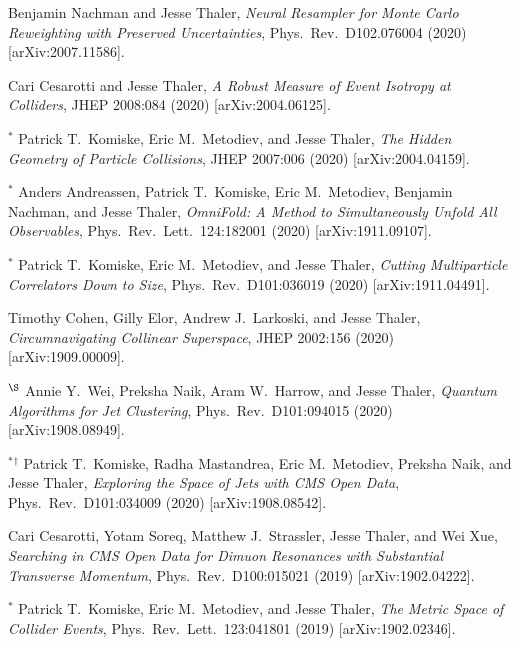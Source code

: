 \begin{list}{[]\addtocounter{jessecount}{-1}}{\leftmargin=3em \itemsep=4pt}
\item
 Benjamin Nachman and Jesse Thaler,
\emph{Neural Resampler for Monte Carlo Reweighting with Preserved Uncertainties},
Phys.\ Rev.\ D102.076004 (2020)
[arXiv:2007.11586].

\item
 Cari Cesarotti and Jesse Thaler,
\emph{A Robust Measure of Event Isotropy at Colliders},
JHEP 2008:084 (2020)
[arXiv:2004.06125].

\item
${}^\ast$ Patrick T.\ Komiske, Eric M.\ Metodiev, and Jesse Thaler,
\emph{The Hidden Geometry of Particle Collisions},
JHEP 2007:006 (2020)
[arXiv:2004.04159].

\item
${}^\ast$ Anders Andreassen, Patrick T.\ Komiske, Eric M.\ Metodiev, Benjamin Nachman, and Jesse Thaler,
\emph{OmniFold: A Method to Simultaneously Unfold All Observables},
Phys.\ Rev.\ Lett.\ 124:182001 (2020)
[arXiv:1911.09107].

\item
${}^\ast$ Patrick T.\ Komiske, Eric M.\ Metodiev, and Jesse Thaler,
\emph{Cutting Multiparticle Correlators Down to Size},
Phys.\ Rev.\ D101:036019 (2020)
[arXiv:1911.04491].

\item
 Timothy Cohen, Gilly Elor, Andrew J.\ Larkoski, and Jesse Thaler,
\emph{Circumnavigating Collinear Superspace},
JHEP 2002:156 (2020)
[arXiv:1909.00009].

\item
${}^\S$ Annie Y.\ Wei, Preksha Naik, Aram W.\ Harrow, and Jesse Thaler,
\emph{Quantum Algorithms for Jet Clustering},
Phys.\ Rev.\ D101:094015 (2020)
[arXiv:1908.08949].

\item
${}^\ast$${}^\dagger$ Patrick T.\ Komiske, Radha Mastandrea, Eric M.\ Metodiev, Preksha Naik, and Jesse Thaler,
\emph{Exploring the Space of Jets with CMS Open Data},
Phys.\ Rev.\ D101:034009 (2020)
[arXiv:1908.08542].

\item
 Cari Cesarotti, Yotam Soreq, Matthew J.\ Strassler, Jesse Thaler, and Wei Xue,
\emph{Searching in CMS Open Data for Dimuon Resonances with Substantial Transverse Momentum},
Phys.\ Rev.\ D100:015021 (2019)
[arXiv:1902.04222].

\item
${}^\ast$ Patrick T.\ Komiske, Eric M.\ Metodiev, and Jesse Thaler,
\emph{The Metric Space of Collider Events},
Phys.\ Rev.\ Lett.\ 123:041801 (2019)
[arXiv:1902.02346].


\end{list}
